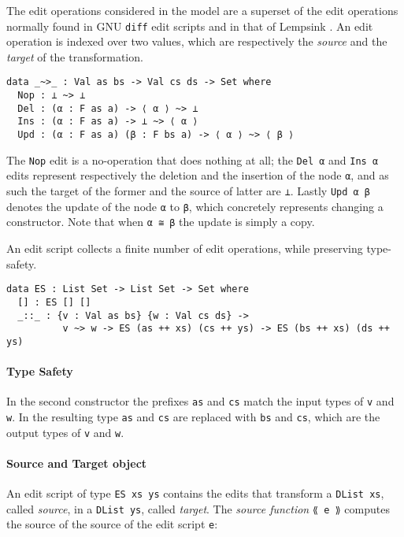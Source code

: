 \documentclass[../Thesis.tex]{subfiles}
\begin{document}
	The edit operations considered in the model are a superset of the edit
	operations normally found in GNU \texttt{diff} edit scripts and in 
	that of Lempsink \cite{Lemp09}.
	An edit operation is indexed over two values, which are respectively
	the \emph{source} and the \emph{target} of the transformation.
	
\begin{verbatim}
data _~>_ : Val as bs -> Val cs ds -> Set where
  Nop : ⊥ ~> ⊥
  Del : (α : F as a) -> ⟨ α ⟩ ~> ⊥
  Ins : (α : F as a) -> ⊥ ~> ⟨ α ⟩
  Upd : (α : F as a) (β : F bs a) -> ⟨ α ⟩ ~> ⟨ β ⟩
\end{verbatim}
	
	The \texttt{Nop} edit is a no-operation that does nothing
	at all; the \texttt{Del α} and \texttt{Ins α} edits represent 
	respectively the deletion and the insertion of the node \texttt{α}, and as 
	such the target of the former and the source of latter are \texttt{⊥}.
	Lastly \texttt{Upd α β} denotes the update of the node \texttt{α}
	to \texttt{β}, which concretely represents changing a constructor. 
	Note that when \texttt{α ≅ β} the update is simply a copy.

	An edit script collects a finite number of edit operations, 
	while preserving type-safety.
\begin{verbatim}
data ES : List Set -> List Set -> Set where
  [] : ES [] []
  _::_ : {v : Val as bs} {w : Val cs ds} -> 
          v ~> w -> ES (as ++ xs) (cs ++ ys) -> ES (bs ++ xs) (ds ++ ys)
\end{verbatim}

	\paragraph{Type Safety}
	In the second constructor the prefixes \texttt{as} and \texttt{cs} match
	the input types of \texttt{v} and \texttt{w}.
	In the resulting type \texttt{as} and \texttt{cs} are replaced with
	\texttt{bs} and \texttt{cs}, which are the output types of 
	\texttt{v} and \texttt{w}.
	
	\paragraph{Source and Target object}
	\label{par:SourceTargetObj}
	An edit script of type \texttt{ES xs ys} contains the edits
	that transform a \texttt{DList xs}, called \emph{source}, 
	in a \texttt{DList ys}, called \emph{target}. 
	The \emph{source function} \texttt{⟪ e ⟫} computes
	the source of the source of the edit script \texttt{e}:
		
\end{document}
